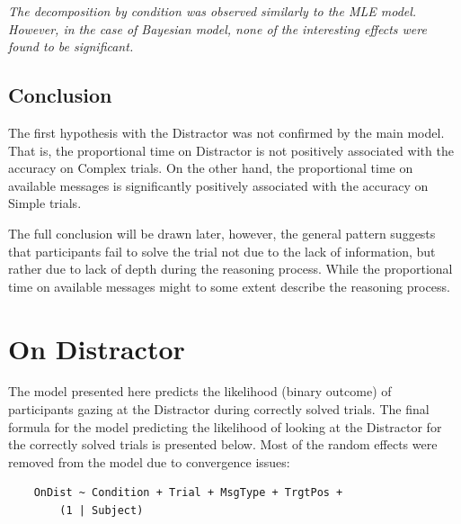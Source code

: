 \emph{The decomposition by condition was observed similarly to the MLE model. However, in the case of Bayesian model, none of the interesting effects were found to be significant. }

\subsection*{Conclusion}
The first hypothesis with the Distractor was not confirmed by the main model. That is, the proportional time on Distractor is not positively associated with the accuracy on Complex trials. On the other hand, the proportional time on available messages is significantly positively associated with the accuracy on Simple trials. 

The full conclusion will be drawn later, however, the general pattern suggests that participants fail to solve the trial not due to the lack of information, but rather due to lack of depth during the reasoning process. While the proportional time on available messages might to some extent describe the reasoning process.












\section{On Distractor}
\label{sec:distractor_model}

The model presented here predicts the likelihood (binary outcome) of participants gazing at the Distractor during correctly solved trials. The final formula for the model predicting the likelihood of looking at the Distractor for the correctly solved trials is presented below. Most of the random effects were removed from the model due to convergence issues:
\begin{verbatim}
    OnDist ~ Condition + Trial + MsgType + TrgtPos +
        (1 | Subject)
\end{verbatim}

